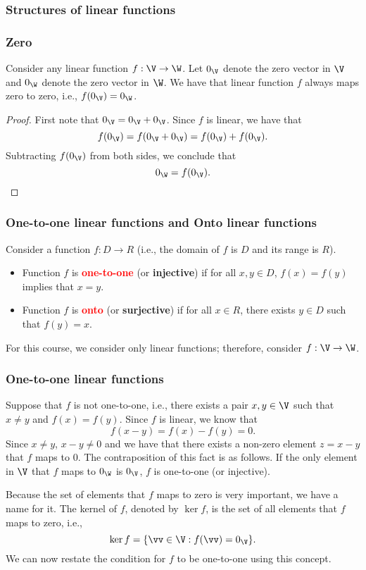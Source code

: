 \begin{frame}
  \frametitle{Structures of linear functions}
\end{frame}

\begin{frame}
  \frametitle{Zero}

\begin{lemma}
  Consider any linear function $f:\V\rightarrow\W$.  Let $0_\V$ denote
  the zero vector in $\V$ and $0_\W$ denote the zero vector in $\W$.
  We have that linear function $f$ always maps zero to zero, i.e.,
  $f(0_\V)=0_\W$.
\end{lemma}
\begin{proof}
  First note that $0_\V=0_\V+0_\V$.  Since $f$ is linear, we have that
  \[
  f(0_\V)=f(0_\V+0_\V)=f(0_\V)+f(0_\V).
  \]
  Subtracting $f(0_\V)$ from both sides, we conclude that
  \[
  0_\W=f(0_\V).
  \]
\end{proof}
\end{frame}

\begin{frame}
\frametitle{One-to-one linear functions and Onto linear functions}

Consider a function $f:D\rightarrow R$ (i.e., the domain of $f$ is $D$
and its range is $R$).

\begin{itemize}
\item
  Function $f$ is \textcolor{red}{\bf one-to-one} (or {\bf injective}) if for all
  $x,y\in D$, $f(x)=f(y)$ implies that $x=y$.
\item
  Function $f$ is \textcolor{red}{\bf onto} (or {\bf surjective}) if for all $x\in
  R$, there exists $y\in D$ such that $f(y)=x$.
\end{itemize}

For this course, we consider only linear functions; therefore,
consider $f:\V\rightarrow\W$.
\end{frame}

\begin{frame}
\frametitle{One-to-one linear functions}

Suppose that $f$ is not one-to-one, i.e., there exists a pair
$x,y\in\V$ such that $x\neq y$ and $f(x)=f(y)$. Since $f$ is linear,
we know that
\[
f(x-y)=f(x)-f(y)=0.
\]
Since $x\neq y$, $x-y\neq 0$ and we have that there exists a non-zero
element $z=x-y$ that $f$ maps to $0$.  The contraposition of this fact
is as follows.  If the only element in $\V$ that $f$ maps to $0_\W$ is
$0_\V$, $f$ is one-to-one (or injective).

Because the set of elements that $f$ maps to zero is very important,
we have a name for it.  The kernel of $f$, denoted by $\ker f$, is the
set of all elements that $f$ maps to zero, i.e.,
\[
\ker f = \{\vv\in\V : f(\vv) = 0_\V\}.
\]
We can now restate the condition for $f$ to be one-to-one using this
concept.
\end{frame}

